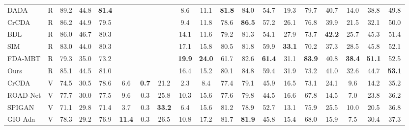 \documentclass[runningheads]{llncs}
\begin{document}
\begin{table*}[t]
\begin{center}
\begin{tabular}{ @{} l|c|*{16}{c}|*{1}{c} @{} }
				DADA \cite{vu2019dada} & R &
				89.2 & 44.8 & \bf 81.4 & \textemdash & \textemdash & \textemdash & 8.6 & 11.1 & \bf81.8 & 84.0 & 54.7 & 19.3 & 79.7 & 40.7 & 14.0 & 38.8 & 49.8 \\
				
				CrCDA \cite{huang2020contextual} & R &
				86.2 & 44.9 & 79.5 & \textemdash & \textemdash & \textemdash & 9.4 & 11.8 & 78.6 & \bf 86.5 & 57.2 & 
				26.1 & 76.8 & 39.9 & 21.5 & 32.1 & 50.0 \\
				
				BDL \cite{li2019bidirectional} & R &
				86.0 & 46.7 & 80.3 & \textemdash & \textemdash & \textemdash & 14.1 & 11.6 & 79.2 & 81.3 & 54.1 & 27.9 & 73.7 & \bf42.2 & 25.7 & 45.3 & 51.4 \\
				
				SIM \cite{wang2020differential} & R &
				83.0 & 44.0 & 80.3 & \textemdash & \textemdash &  \textemdash & 17.1 & 15.8 & 80.5 & 81.8 & 
				59.9 & \bf 33.1 & 70.2 & 37.3 & 28.5 & 45.8 & 52.1 \\
				
				FDA-MBT \cite{yang2020fda} & R &
				79.3 & 35.0 & 73.2 & \textemdash & \textemdash &  \textemdash & \bf 19.9 & \bf 24.0 & 61.7 & 82.6 & \bf 61.4 & 
				31.1 & \bf 83.9 & 40.8 & \bf 38.4 & \bf 51.1 & 52.5 \\
				\midrule
				
				Ours & R &
				85.1&44.5&81.0& \textemdash & \textemdash & \textemdash&16.4&15.2&80.1&84.8&59.4&31.9&73.2&41.0&32.6&44.7&\bf53.1 \\
				
				\midrule
				\midrule
				CrCDA \cite{huang2020contextual} & V &
				74.5 & 30.5 & 78.6 & 6.6 & \bf 0.7 & 21.2 & 2.3 & 
				8.4 & 77.4 & 79.1 & 45.9 & 16.5 & 73.1 & 24.1 & 
				9.6 & 14.2 & 35.2 \\
				
				ROAD-Net \cite{chen2018road} & V &
				77.7 & 30.0 & 77.5 & 9.6 & 0.3 & 25.8 & 10.3 & 15.6 & 77.6 & 79.8 & 44.5 & 
				16.6 & 67.8 & 14.5 & 7.0 & 23.8 & 36.2 \\
				
				SPIGAN \cite{lee2018spigan} & V &
				71.1 & 29.8 & 71.4 & 3.7 & 0.3 & \bf33.2 & 6.4 & 15.6 & 81.2 & 78.9 & 52.7 & 
				13.1 & 75.9 & 25.5 & 10.0 & 20.5 & 36.8 \\
				
				GIO-Ada \cite{chen2019learning} & V &
				78.3 & 29.2 & 76.9 & \bf11.4 & 0.3 & 26.5 & 10.8 & 17.2 & 81.7 & \bf81.9 & 45.8 & 
				15.4 & 68.0 & 15.9 & 7.5 & 30.4 & 37.3 \\
				

\end{tabular}
\end{center}
\end{table*}
\end{document}
